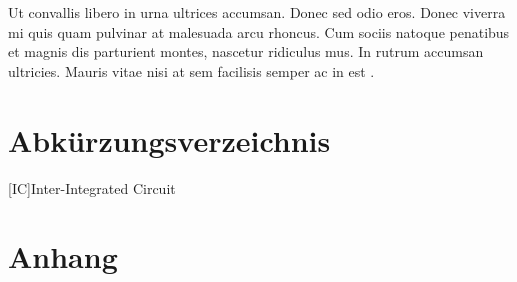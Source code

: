 \documentclass[a4paper,12pt]{article}
\begin{document}
Ut convallis libero in urna ultrices accumsan. Donec sed odio eros. Donec viverra mi quis quam pulvinar at malesuada arcu rhoncus. Cum sociis natoque penatibus et magnis dis parturient montes, nascetur ridiculus mus. In rutrum accumsan ultricies. Mauris vitae nisi at sem facilisis semper ac in est \cite{Pleisteiner.2007}.

\newpage
{}
\printbibliography
\newpage
\printindex
\newpage
\section*{Abkürzungsverzeichnis}
\begin{acronym}[Bash]
 [IC]{Inter-Integrated Circuit}
\end{acronym}
\newpage
{}
\listoffigures
\newpage
{}
\listoftables
\newpage
\section*{Anhang}
\end{document}
